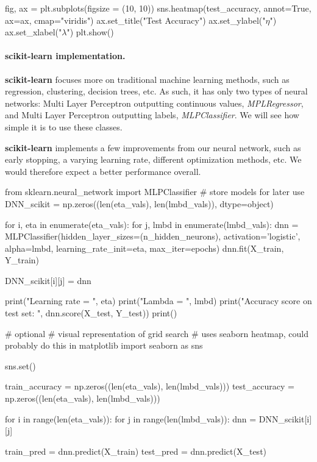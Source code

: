 \documentclass[%
oneside,                 %
final,                   %
10pt]{article}
\begin{document}
fig, ax = plt.subplots(figsize = (10, 10))
sns.heatmap(test_accuracy, annot=True, ax=ax, cmap="viridis")
ax.set_title("Test Accuracy")
ax.set_ylabel("$\eta$")
ax.set_xlabel("$\lambda$")
plt.show()
\epycod

\paragraph{scikit-learn implementation.}
\textbf{scikit-learn} focuses more
on traditional machine learning methods, such as regression,
clustering, decision trees, etc. As such, it has only two types of
neural networks: Multi Layer Perceptron outputting continuous values,
\emph{MPLRegressor}, and Multi Layer Perceptron outputting labels,
\emph{MLPClassifier}. We will see how simple it is to use these classes.

\textbf{scikit-learn} implements a few improvements from our neural network,
such as early stopping, a varying learning rate, different
optimization methods, etc. We would therefore expect a better
performance overall.

\bpycod
from sklearn.neural_network import MLPClassifier
# store models for later use
DNN_scikit = np.zeros((len(eta_vals), len(lmbd_vals)), dtype=object)

for i, eta in enumerate(eta_vals):
    for j, lmbd in enumerate(lmbd_vals):
        dnn = MLPClassifier(hidden_layer_sizes=(n_hidden_neurons), activation='logistic',
                            alpha=lmbd, learning_rate_init=eta, max_iter=epochs)
        dnn.fit(X_train, Y_train)
        
        DNN_scikit[i][j] = dnn
        
        print("Learning rate  = ", eta)
        print("Lambda = ", lmbd)
        print("Accuracy score on test set: ", dnn.score(X_test, Y_test))
        print()
\epycod


\bpycod
# optional
# visual representation of grid search
# uses seaborn heatmap, could probably do this in matplotlib
import seaborn as sns

sns.set()

train_accuracy = np.zeros((len(eta_vals), len(lmbd_vals)))
test_accuracy = np.zeros((len(eta_vals), len(lmbd_vals)))

for i in range(len(eta_vals)):
    for j in range(len(lmbd_vals)):
        dnn = DNN_scikit[i][j]
        
        train_pred = dnn.predict(X_train) 
        test_pred = dnn.predict(X_test)
\end{document}
